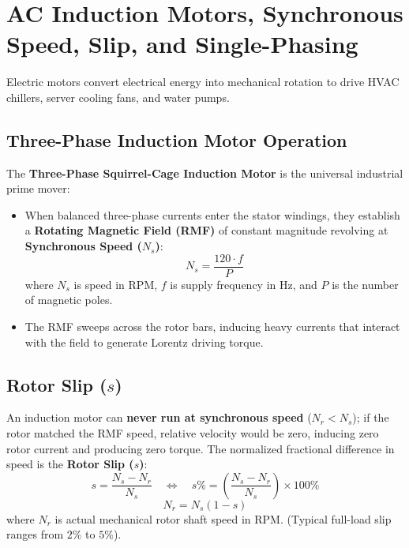 \section{AC Induction Motors, Synchronous Speed, Slip, and Single-Phasing}
\label{sec:electric_motors}

Electric motors convert electrical energy into mechanical rotation to drive HVAC chillers, server cooling fans, and water pumps.

\subsection{Three-Phase Induction Motor Operation}
The \textbf{Three-Phase Squirrel-Cage Induction Motor} is the universal industrial prime mover:
\begin{itemize}
    \item When balanced three-phase currents enter the stator windings, they establish a \textbf{Rotating Magnetic Field (RMF)} of constant magnitude revolving at \textbf{Synchronous Speed ($N_s$)}:
    \begin{equation}
    \label{eq:synchronous_speed}
    \boxed{N_s = \frac{120 \cdot f}{P}}
    \end{equation}
    where $N_s$ is speed in RPM, $f$ is supply frequency in Hz, and $P$ is the number of magnetic poles.
    \item The RMF sweeps across the rotor bars, inducing heavy currents that interact with the field to generate Lorentz driving torque.
\end{itemize}

\subsection{Rotor Slip ($s$)}
An induction motor can \textbf{never run at synchronous speed} ($N_r < N_s$); if the rotor matched the RMF speed, relative velocity would be zero, inducing zero rotor current and producing zero torque.
The normalized fractional difference in speed is the \textbf{Rotor Slip ($s$)}:
\begin{equation}
\label{eq:motor_slip}
\boxed{s = \frac{N_s - N_r}{N_s} \quad \Longleftrightarrow \quad s\% = \left( \frac{N_s - N_r}{N_s} \right) \times 100\%}
\end{equation}
\begin{equation}
\label{eq:rotor_speed}
\boxed{N_r = N_s (1 - s)}
\end{equation}
where $N_r$ is actual mechanical rotor shaft speed in RPM. (Typical full-load slip ranges from $2\%$ to $5\%$).

